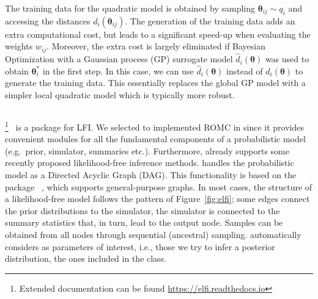 \documentclass[article]{jss}
\newcommand{\thetab}{\boldsymbol{\theta}}
\begin{document}
The training data for the quadratic model is obtained by sampling
\(\thetab_{ij} \sim q_i\) and accessing the distances
\(d_i(\thetab_{ij})\). The generation of the training data adds an
extra computational cost, but leads to a significant speed-up when
evaluating the weights \(w_{ij}\). Moreover, the extra cost is largely
eliminated if Bayesian Optimization with a Gaussian process (GP)
surrogate model \(\hat{d}_i(\thetab)\) was used to obtain
\(\thetab_i^*\) in the first step. In this case, we can use
\(\hat{d}_i(\thetab)\) instead of \(d_i(\thetab)\) to generate the
training data. This essentially replaces the global GP model with a
simpler local quadratic model which is typically more robust.

\subsection[Engine for likelihood-free inference (ELFI)]{}
\label{subsec:ELFI}

\footnote{Extended
  documentation can be found
  \href{https://elfi.readthedocs.io/en/latest/}{https://elfi.readthedocs.io}}~\cite{1708.00707}
is a  package for LFI. We selected to implemented
ROMC in  since it provides convenient modules for all the
fundamental components of a probabilistic model (e.g.\ prior,
simulator, summaries etc.). Furthermore,  already supports
some recently proposed likelihood-free inference methods. 
handles the probabilistic model as a Directed Acyclic Graph
(DAG). This functionality is based on the package
~\cite{hagberg2008exploring}, which supports
general-purpose graphs. In most cases, the structure of a
likelihood-free model follows the pattern of Figure~\ref{fig:elfi};
some edges connect the prior distributions to the simulator, the
simulator is connected to the summary statistics that, in turn, lead
to the output node. Samples can be obtained from all nodes through
sequential (ancestral) sampling.  automatically considers as
parameters of interest, i.e., those we try to infer a posterior
distribution, the ones included in the  class.
\end{document}
